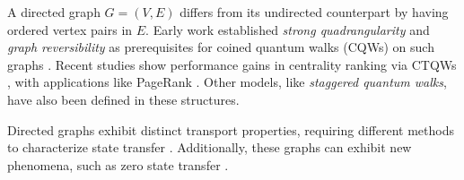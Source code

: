 \documentclass[../../main.tex]{subfiles}
\begin{document}
%
%
%


A directed graph $G=(V,E)$ differs from its undirected counterpart by having
ordered vertex pairs in $E$. Early work established \textit{strong
quadrangularity} and \textit{graph reversibility} as prerequisites for coined
quantum walks (CQWs) on such graphs
\cite{severiniUnderlying03,severiniDigraph03,montanaroQuantum05}. Recent
studies show performance gains in centrality ranking via CTQWs
\cite{Caruso2016}, with applications like PageRank \cite{Wang2020}. Other
models, like \textit{staggered quantum walks}, have also been defined
\cite{chagas20} in these structures.

Directed graphs exhibit distinct transport properties, requiring different
methods to characterize state transfer \cite{godsilPerfect2020}. Additionally,
these graphs can exhibit new phenomena, such as zero state transfer \cite{Sett2019}.
\end{document}
